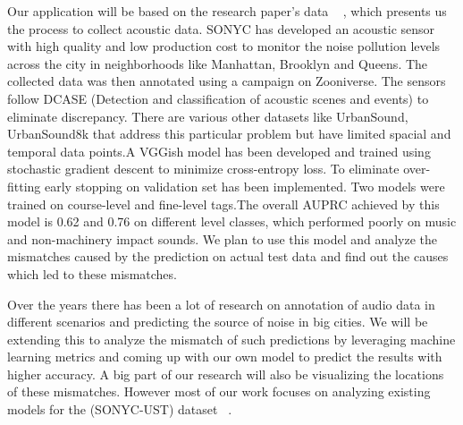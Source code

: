 Our application will be based on the research paper's data ~ \cite{4}, which presents us the process to collect acoustic data. SONYC has developed an acoustic sensor with high quality and low production cost to monitor the noise pollution levels across the city in neighborhoods like Manhattan, Brooklyn and Queens. The collected data was then annotated using a campaign on Zooniverse. The sensors follow DCASE (Detection and classification of acoustic scenes and events) to eliminate discrepancy. There are various other datasets like UrbanSound, UrbanSound8k that address this particular problem but have limited spacial and temporal data points.A VGGish model has been developed and trained using stochastic gradient descent to minimize cross-entropy loss. To eliminate over-fitting early stopping on validation set has been implemented. Two models were trained on course-level and fine-level tags.The overall AUPRC achieved by this model is 0.62 and 0.76 on different level classes, which performed poorly on music and non-machinery impact sounds. We plan to use this model and analyze the mismatches caused by the prediction on actual test data and find out the causes which led to these mismatches. 

Over the years there has been a lot of research on annotation of audio data in different scenarios and predicting the source of noise in big cities. We will be extending this to analyze the mismatch of such predictions by leveraging machine learning metrics and coming up with our own model to predict the results with higher accuracy. A big part of our research will also be visualizing the locations of these mismatches. However most of our work focuses on analyzing existing models for the (SONYC-UST) dataset ~\cite{7}.
